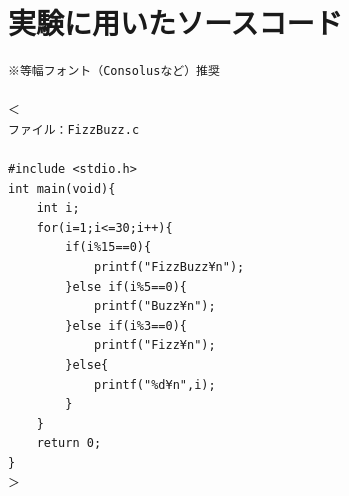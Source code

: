 \section*{実験に⽤いたソースコード}

\begin{verbatim}
※等幅フォント（Consolusなど）推奨

＜
ファイル：FizzBuzz.c

#include <stdio.h>
int main(void){
    int i;
    for(i=1;i<=30;i++){
        if(i%15==0){
            printf("FizzBuzz¥n");
        }else if(i%5==0){
            printf("Buzz¥n");
        }else if(i%3==0){
            printf("Fizz¥n");
        }else{
            printf("%d¥n",i);
        }
    }
    return 0;
}
＞    
\end{verbatim}
